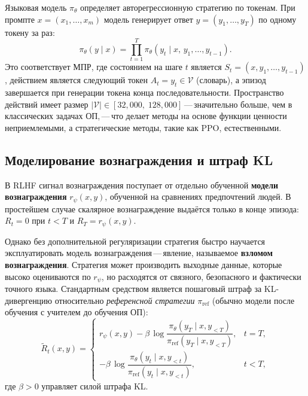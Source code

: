 Языковая модель $\pi_\theta$ определяет авторегрессионную стратегию по токенам. При промпте $x = (x_1, \ldots, x_m)$ модель генерирует ответ $y = (y_1, \ldots, y_T)$ по одному токену за раз:
\begin{equation}
\label{eq:lm-policy}
\pi_\theta(y \mid x)
= \prod_{t=1}^T \pi_\theta(y_t \mid x,\, y_1, \ldots, y_{t-1}).
\end{equation}
Это соответствует МПР, где состоянием на шаге $t$ является $S_t = (x, y_1, \ldots, y_{t-1})$, действием является следующий токен $A_t = y_t \in \mathcal{V}$ (словарь), а эпизод завершается при генерации токена конца последовательности. Пространство действий имеет размер $|\mathcal{V}| \in [32{,}000,\; 128{,}000]$\,---\,значительно больше, чем в классических задачах ОП,\,---\,что делает методы на основе функции ценности неприемлемыми, а стратегические методы, такие как PPO, естественными.

\subsection{Моделирование вознаграждения и штраф KL}

В RLHF сигнал вознаграждения поступает от отдельно обученной \textbf{модели вознаграждения} $r_\psi(x, y)$, обученной на сравнениях предпочтений людей. В простейшем случае скалярное вознаграждение выдаётся только в конце эпизода: $R_t = 0$ при $t < T$ и $R_T = r_\psi(x, y)$.

Однако без дополнительной регуляризации стратегия быстро научается эксплуатировать модель вознаграждения\,---\,явление, называемое \textbf{взломом вознаграждения}. Стратегия может производить выходные данные, которые высоко оцениваются по $r_\psi$, но расходятся от связного, безопасного и фактически точного языка. Стандартным средством является пошаговый штраф за KL-дивергенцию относительно \emph{референсной стратегии} $\pi_{\mathrm{ref}}$ (обычно модели после обучения с учителем до обучения ОП):
\begin{equation}
\label{eq:rlhf-reward}
\tilde{R}_t(x, y)
=
\begin{cases}
r_\psi(x, y)
  - \beta\,\log\dfrac{\pi_\theta(y_T \mid x, y_{<T})}
                      {\pi_{\mathrm{ref}}(y_T \mid x, y_{<T})},
& t = T, \\[8pt]
- \beta\,\log\dfrac{\pi_\theta(y_t \mid x, y_{<t})}
                    {\pi_{\mathrm{ref}}(y_t \mid x, y_{<t})},
& t < T,
\end{cases}
\end{equation}
где $\beta > 0$ управляет силой штрафа KL.

